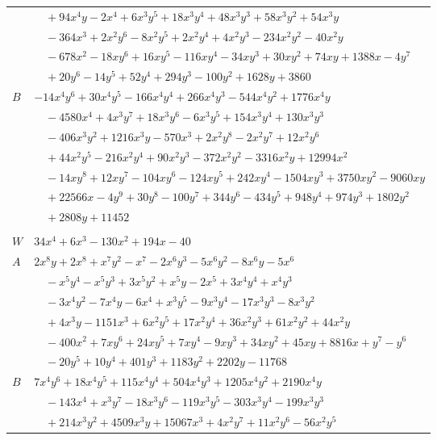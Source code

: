 \documentclass[11pt]{article}
\begin{document}
\begin{longtable}{@{}ll@{}}
 & $\quad +94x^{4}y-2x^{4}+6x^{3}y^{5}+18x^{3}y^{4}+48x^{3}y^{3}+58x^{3}y^{2}+54x^{3}y$\\
 & $\quad -364x^{3}+2x^{2}y^{6}-8x^{2}y^{5}+2x^{2}y^{4}+4x^{2}y^{3}-234x^{2}y^{2}-40x^{2}y$\\
 & $\quad -678x^{2}-18xy^{6}+16xy^{5}-116xy^{4}-34xy^{3}+30xy^{2}+74xy+1388x-4y^{7}$\\
 & $\quad +20y^{6}-14y^{5}+52y^{4}+294y^{3}-100y^{2}+1628y+3860$\\
$B$ & $-14x^{4}y^{6}+30x^{4}y^{5}-166x^{4}y^{4}+266x^{4}y^{3}-544x^{4}y^{2}+1776x^{4}y$\\
 & $\quad -4580x^{4}+4x^{3}y^{7}+18x^{3}y^{6}-6x^{3}y^{5}+154x^{3}y^{4}+130x^{3}y^{3}$\\
 & $\quad -406x^{3}y^{2}+1216x^{3}y-570x^{3}+2x^{2}y^{8}-2x^{2}y^{7}+12x^{2}y^{6}$\\
 & $\quad +44x^{2}y^{5}-216x^{2}y^{4}+90x^{2}y^{3}-372x^{2}y^{2}-3316x^{2}y+12994x^{2}$\\
 & $\quad -14xy^{8}+12xy^{7}-104xy^{6}-124xy^{5}+242xy^{4}-1504xy^{3}+3750xy^{2}-9060xy$\\
 & $\quad +22566x-4y^{9}+30y^{8}-100y^{7}+344y^{6}-434y^{5}+948y^{4}+974y^{3}+1802y^{2}$\\
 & $\quad +2808y+11452$\\
\addlinespace[3pt]
\multicolumn{2}{@{}l}{$g=2$, $i=14$, $m=1$, neighbours $45,2,3,5,11,28,38,39,40,42$}\\
$W$ & $34x^{4}+6x^{3}-130x^{2}+194x-40$\\
$A$ & $2x^{8}y+2x^{8}+x^{7}y^{2}-x^{7}-2x^{6}y^{3}-5x^{6}y^{2}-8x^{6}y-5x^{6}$\\
 & $\quad -x^{5}y^{4}-x^{5}y^{3}+3x^{5}y^{2}+x^{5}y-2x^{5}+3x^{4}y^{4}+x^{4}y^{3}$\\
 & $\quad -3x^{4}y^{2}-7x^{4}y-6x^{4}+x^{3}y^{5}-9x^{3}y^{4}-17x^{3}y^{3}-8x^{3}y^{2}$\\
 & $\quad +4x^{3}y-1151x^{3}+6x^{2}y^{5}+17x^{2}y^{4}+36x^{2}y^{3}+61x^{2}y^{2}+44x^{2}y$\\
 & $\quad -400x^{2}+7xy^{6}+24xy^{5}+7xy^{4}-9xy^{3}+34xy^{2}+45xy+8816x+y^{7}-y^{6}$\\
 & $\quad -20y^{5}+10y^{4}+401y^{3}+1183y^{2}+2202y-11768$\\
$B$ & $7x^{4}y^{6}+18x^{4}y^{5}+115x^{4}y^{4}+504x^{4}y^{3}+1205x^{4}y^{2}+2190x^{4}y$\\
 & $\quad -143x^{4}+x^{3}y^{7}-18x^{3}y^{6}-119x^{3}y^{5}-303x^{3}y^{4}-199x^{3}y^{3}$\\
 & $\quad +214x^{3}y^{2}+4509x^{3}y+15067x^{3}+4x^{2}y^{7}+11x^{2}y^{6}-56x^{2}y^{5}$\\

\end{longtable}
\end{document}
